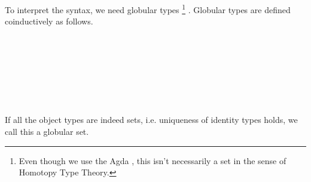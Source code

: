 

To interpret the syntax, we need globular types
\footnote{Even though we use the Agda , this isn't necessarily a set in the sense of Homotopy Type Theory.}
. Globular types are defined coinductively as follows.

\begin{code}\>\<%
\\
\>  \AgdaSymbol{:}  \<%
\\
\>[0]\<[2]%
\>[2] \<%
\\
\>[0]\<[2]%
\>[2]\<%
\\
\>[2]\<[4]%
\>[4] \<[10]%
\>[10]\AgdaSymbol{:} \<%
\\
\>[2]\<[4]%
\>[4] \<[9]%
\>[9]\AgdaSymbol{:}      \<%
\\
\>\<\end{code}
If all the object types are indeed sets, i.e. uniqueness of identity types holds, we call this a globular set.


